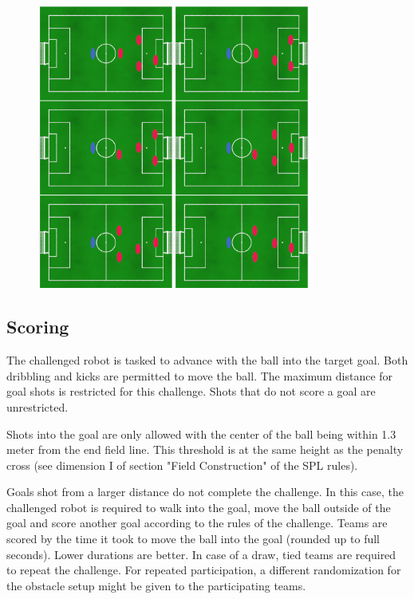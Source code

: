 \begin{figure}[ht]
    \centering
	\includegraphics[width=0.8\textwidth]{figs/obstacle_challenge_2021_a.jpeg}
\end{figure}

\subsection{Scoring}

The challenged robot is tasked to advance with the ball into the target goal. Both dribbling and kicks are permitted to move the ball. The maximum distance for goal shots is restricted for this challenge. Shots that do not score a goal are unrestricted.

Shots into the goal are only allowed with the center of the ball being within 1.3 meter from the end field line. This threshold is at the same height as the penalty cross (see dimension I of section "Field Construction" of the SPL rules).

Goals shot from a larger distance do not complete the challenge. In this case, the challenged robot is required to walk into the goal, move the ball outside of the goal and score another goal according to the rules of the challenge.
Teams are scored by the time it took to move the ball into the goal (rounded up to full seconds). Lower durations are better. In case of a draw, tied teams are required to repeat the challenge. For repeated participation, a different randomization for the obstacle setup might be given to the participating teams.

